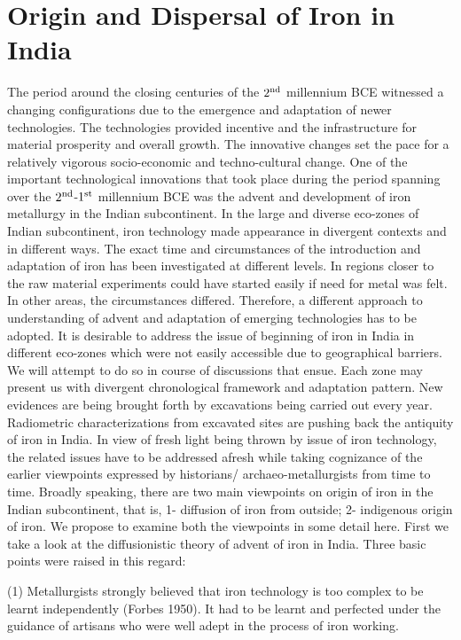 \chapter{Origin and Dispersal of Iron in India}\label{chapter3}


The period around the closing centuries of the $2^{\rm nd}$ millennium BCE witnessed a changing configurations due to the emergence and adaptation of newer technologies. The technologies provided incentive and the infrastructure for material prosperity and overall growth. The innovative changes set the pace for a relatively vigorous socio-economic and techno-cultural change. One of the important technological innovations that took place during the period spanning over the $2^{\rm nd}$-$1^{\rm st}$ millennium BCE was the advent and development of iron metallurgy in the Indian subcontinent. In the large and diverse eco-zones of Indian subcontinent, iron technology made appearance in divergent contexts and in different ways. The exact time and circumstances of the introduction and adaptation of iron has been investigated at different levels. In regions closer to the raw material experiments could have started easily if need for metal was felt. In other areas, the circumstances differed. Therefore, a different approach to understanding of advent and adaptation of emerging technologies has to be adopted. It is desirable to address the issue of beginning of iron in India in different eco-zones which were not easily accessible due to geographical barriers. We will attempt to do so in course of discussions that ensue. Each zone may present us with divergent chronological framework and adaptation pattern. New evidences are being brought forth by excavations being carried out every year. Radiometric characterizations from excavated sites are pushing back the antiquity of iron in India. In view of fresh light being thrown by issue of iron technology, the related issues have to be addressed afresh while taking cognizance of the earlier viewpoints expressed by historians/ archaeo-metallurgists from time to time. Broadly speaking, there are two main viewpoints on origin of iron in the Indian subcontinent, that is, 1- diffusion of iron from outside; 2- indigenous origin of iron. We propose to examine both the viewpoints in some detail here.  First we take a look at the diffusionistic theory of advent of iron in India. Three basic points were raised in this regard:


(1) Metallurgists strongly believed that iron technology is too complex to be learnt independently (Forbes 1950). It had to be learnt and perfected under the guidance of artisans who were well adept in the process of iron working.

